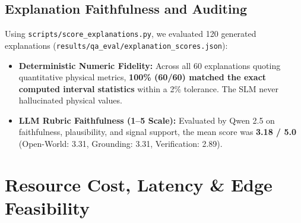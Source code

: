 \documentclass[11pt,a4paper]{article}
\begin{document}
\subsection{Explanation Faithfulness and Auditing}
Using \nolinkurl{scripts/score_explanations.py}, we evaluated 120 generated explanations (\nolinkurl{results/qa_eval/explanation_scores.json}):
\begin{itemize}[noitemsep,topsep=1pt]
  \item \textbf{Deterministic Numeric Fidelity:} Across all 60 explanations quoting quantitative physical metrics, \textbf{100\% (60/60) matched the exact computed interval statistics} within a 2\% tolerance. The SLM never hallucinated physical values.
  \item \textbf{LLM Rubric Faithfulness (1--5 Scale):} Evaluated by Qwen 2.5 on faithfulness, plausibility, and signal support, the mean score was \textbf{3.18 / 5.0} (Open-World: 3.31, Grounding: 3.31, Verification: 2.89).
\end{itemize}

\section{Resource Cost, Latency \& Edge Feasibility}
\label{sec:cost}

\begin{table}[t]
\centering
\small
\caption{\textbf{System Resource Footprint and Inference Latency.} Benchmarked on a defined edge target: Windows 11 Laptop, AMD Ryzen 6-Core CPU, 6.3 GB RAM, Python 3.12.2, zero GPU acceleration.}
\label{tab:resource_cost}
\end{table}
\end{document}

